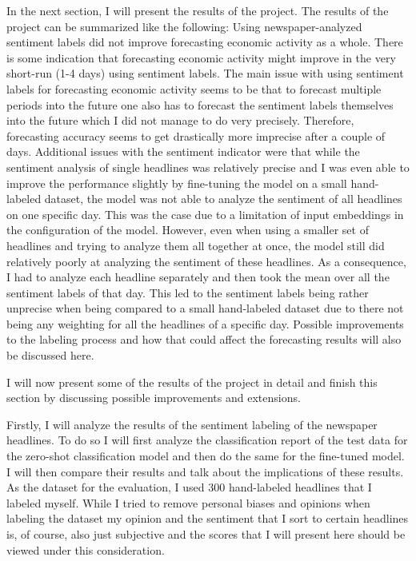 \documentclass[11pt, a4paper, leqno]{article}
\begin{document}
In the next section, I will present the results of the project. The results of the project can be summarized like the following: Using newspaper-analyzed sentiment labels did not improve forecasting economic activity as a whole. There is some indication that forecasting economic activity might improve in the very short-run (1-4 days) using sentiment labels. The main issue with using sentiment labels for forecasting economic activity seems to be that to forecast multiple periods into the future one also has to forecast the sentiment labels themselves into the future which I did not manage to do very precisely. Therefore, forecasting accuracy seems to get drastically more imprecise after a couple of days. Additional issues with the sentiment indicator were that while the sentiment analysis of single headlines was relatively precise and I was even able to improve the performance slightly by fine-tuning the model on a small hand-labeled dataset, the model was not able to analyze the sentiment of all headlines on one specific day. This was the case due to a limitation of input embeddings in the configuration of the model. However, even when using a smaller set of headlines and trying to analyze them all together at once, the model still did relatively poorly at analyzing the sentiment of these headlines. As a consequence, I had to analyze each headline separately and then took the mean over all the sentiment labels of that day. This led to the sentiment labels being rather unprecise when being compared to a small hand-labeled dataset due to there not being any weighting for all the headlines of a specific day. Possible improvements to the labeling process and how that could affect the forecasting results will also be discussed here.

I will now present some of the results of the project in detail and finish this section by discussing possible improvements and extensions.

Firstly, I will analyze the results of the sentiment labeling of the newspaper headlines. To do so I will first analyze the classification report of the test data for the zero-shot classification model and then do the same for the fine-tuned model. I will then compare their results and talk about the implications of these results. As the dataset for the evaluation, I used 300 hand-labeled headlines that I labeled myself. While I tried to remove personal biases and opinions when labeling the dataset my opinion and the sentiment that I sort to certain headlines is, of course, also just subjective and the scores that I will present here should be viewed under this consideration.
\end{document}
